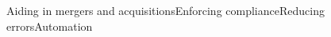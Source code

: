 \documentclass[preview]{standalone}
\begin{document}
\begin{center}
Aiding in mergers and acquisitionsEnforcing complianceReducing errorsAutomation
\end{center}
\end{document}
